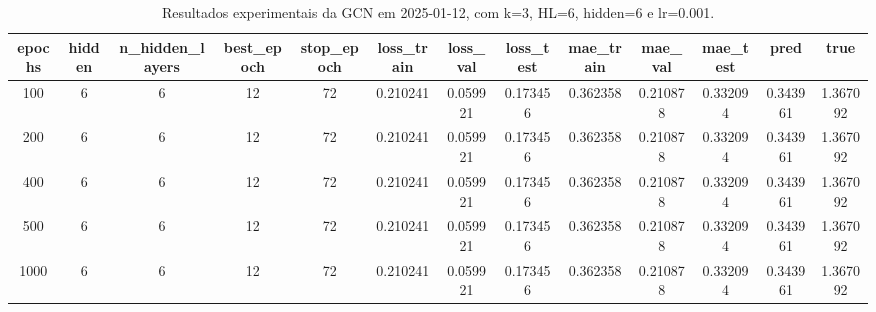 \begin{table}[h]
\centering
\caption{Resultados experimentais da GCN em 2025-01-12, com k=3, HL=6, hidden=6 e lr=0.001.}
\label{tab:gcn_results_k3_hl6_h6_d20250112}
\begin{tabular}{ccccccccccccc}
\toprule
epochs & hidden & n\_hidden\_layers & best\_epoch & stop\_epoch & loss\_train & loss\_val & loss\_test & mae\_train & mae\_val & mae\_test & pred & true \\
\midrule
100 & 6 & 6 & 12 & 72 & 0.210241 & 0.059921 & 0.173456 & 0.362358 & 0.210878 & 0.332094 & 0.343961 & 1.367092 \\
200 & 6 & 6 & 12 & 72 & 0.210241 & 0.059921 & 0.173456 & 0.362358 & 0.210878 & 0.332094 & 0.343961 & 1.367092 \\
400 & 6 & 6 & 12 & 72 & 0.210241 & 0.059921 & 0.173456 & 0.362358 & 0.210878 & 0.332094 & 0.343961 & 1.367092 \\
500 & 6 & 6 & 12 & 72 & 0.210241 & 0.059921 & 0.173456 & 0.362358 & 0.210878 & 0.332094 & 0.343961 & 1.367092 \\
1000 & 6 & 6 & 12 & 72 & 0.210241 & 0.059921 & 0.173456 & 0.362358 & 0.210878 & 0.332094 & 0.343961 & 1.367092 \\
\bottomrule
\end{tabular}
\end{table}
